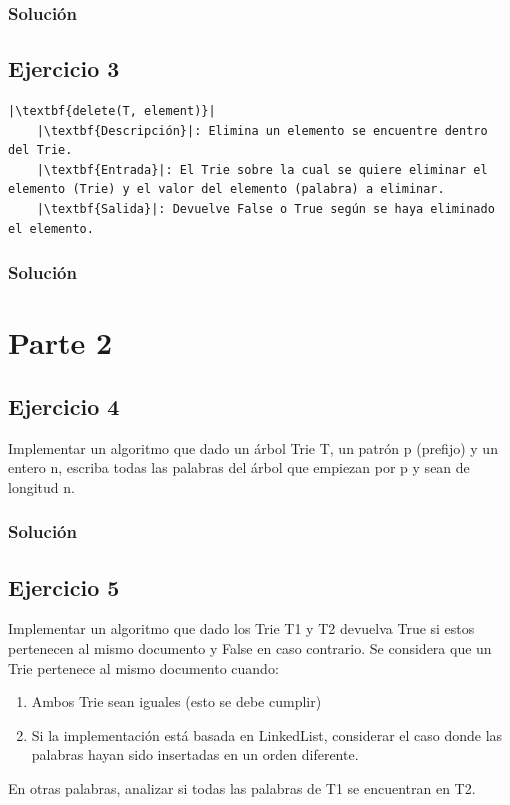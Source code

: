 \documentclass{article}
\begin{document}
\subsubsection*{Solución}


\subsection*{Ejercicio 3}
\begin{lstlisting}
|\textbf{delete(T, element)}|
    |\textbf{Descripción}|: Elimina un elemento se encuentre dentro del Trie.
    |\textbf{Entrada}|: El Trie sobre la cual se quiere eliminar el elemento (Trie) y el valor del elemento (palabra) a eliminar.
    |\textbf{Salida}|: Devuelve False o True según se haya eliminado el elemento.
\end{lstlisting}
\subsubsection*{Solución}


\section*{Parte 2}
\subsection*{Ejercicio 4}
Implementar un algoritmo que dado un árbol Trie T, un patrón p (prefijo) y un entero n, escriba todas las palabras del árbol que empiezan por p y sean de longitud n.
\subsubsection*{Solución}


\subsection*{Ejercicio 5}
Implementar un algoritmo que dado los Trie T1 y T2 devuelva True si estos pertenecen al mismo documento y False en caso contrario. Se considera que un Trie pertenece al mismo documento cuando:
\begin{enumerate}
    \item Ambos Trie sean iguales (esto se debe cumplir)
    \item Si la implementación está basada en LinkedList, considerar el caso donde las palabras hayan sido insertadas en un orden diferente.
\end{enumerate}
En otras palabras, analizar si todas las palabras de T1 se encuentran en T2.
\end{document}
